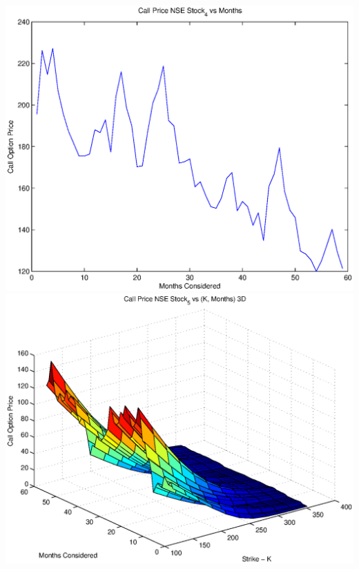 \documentclass{article}
\begin{document}
\includegraphics[width=\textwidth]{Call_Price_NSE_Stock_4_vs_Months} \\

\includegraphics[width=\textwidth]{Call_Price_NSE_Stock_5_vs_(K,_Months)_3D} \\
\end{document}
